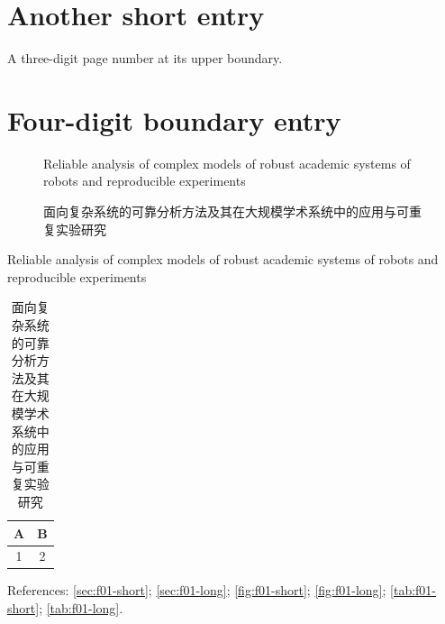 \documentclass[tocdepth3]{uestcthesis}
\begin{document}
\section{Another short entry}
\noindent A three-digit page number at its upper boundary.
\clearpage
\setcounter{page}{1000}
\section{Four-digit boundary entry}
\begin{figure}[H]
  \centering\fbox{\rule{0pt}{1cm}\rule{3cm}{0pt}}
  \ifdefined\FOneEnglish
    \caption{Reliable analysis of complex models of robust academic systems of robots and reproducible experiments}
  \else
    \caption{面向复杂系统的可靠分析方法及其在大规模学术系统中的应用与可重复实验研究}
  \fi
  \label{fig:f01-long}
\end{figure}
\begin{table}[H]
  \centering
  \ifdefined\FOneEnglish
    \caption{Reliable analysis of complex models of robust academic systems of robots and reproducible experiments}
  \else
    \caption{面向复杂系统的可靠分析方法及其在大规模学术系统中的应用与可重复实验研究}
  \fi
  \label{tab:f01-long}
  \begin{tabular}{cc}\toprule A & B \\\midrule 1 & 2 \\\bottomrule\end{tabular}
\end{table}
\noindent References: \autoref{sec:f01-short}; \autoref{sec:f01-long};
\autoref{fig:f01-short}; \autoref{fig:f01-long};
\autoref{tab:f01-short}; \autoref{tab:f01-long}.
\end{document}

